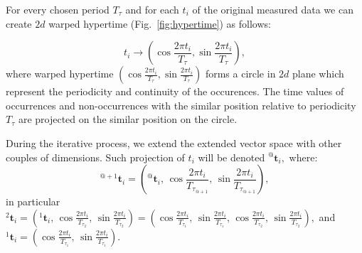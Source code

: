 For every chosen period $T_{\tau}$ and for each $t_i$ of the original measured data we can create $2d$ warped hypertime (Fig.~\ref{fig:hypertime}) as follows:

\begin{equation}
t_i \rightarrow \left(\cos{\frac{2\pi t_{i}}{T_{\tau}}}, \sin{\frac{2\pi t_{i}}{T_{\tau}}}\right),
\end{equation}
%
where warped hypertime $\left(\cos{\frac{2\pi t_{i}}{T_{\tau}}}, \sin{\frac{2\pi t_{i}}{T_{\tau}}}\right)$ forms a circle in $2d$ plane which represent the periodicity and continuity of the occurences.
The time values of occurrences and non-occurrences with the similar position relative to periodicity $T_{\tau}$ are projected on the similar position on the circle.

During the iterative process, we extend the extended vector space with other couples of dimensions.
Such projection of $t_i$ will be denoted ${}^{@}\mathbf{t}_{i},$ where:
%
\begin{equation}\label{eqn:extension}
    {}^{@+1}\mathbf{t}_{i} = \left({}^{@}\mathbf{t}_{i}, \,\cos{\frac{2\pi t_{i}}{T_{\tau_{@+1}}}}, \, \sin{\frac{2\pi t_{i}}{T_{\tau_{@+1}}}}\right),
\end{equation}
%
in particular ${}^{2}\mathbf{t}_{i} =\left({}^{1}\mathbf{t}_{i}, \,\cos{\frac{2\pi t_{i}}{T_{\tau_2}}}, \, \sin{\frac{2\pi t_{i}}{T_{\tau_2}}}\right) =  \left(\cos{\frac{2\pi t_{i}}{T_{\tau_1}}}, \, \sin{\frac{2\pi t_{i}}{T_{\tau_1}}}, \,\cos{\frac{2\pi t_{i}}{T_{\tau_2}}}, \, \sin{\frac{2\pi t_{i}}{T_{\tau_2}}}\right),$ and
${}^{1}\mathbf{t}_{i} = \left(\cos{\frac{2\pi t_{i}}{T_{\tau_1}}}, \, \sin{\frac{2\pi t_{i}}{T_{\tau_1}}}\right)$.



